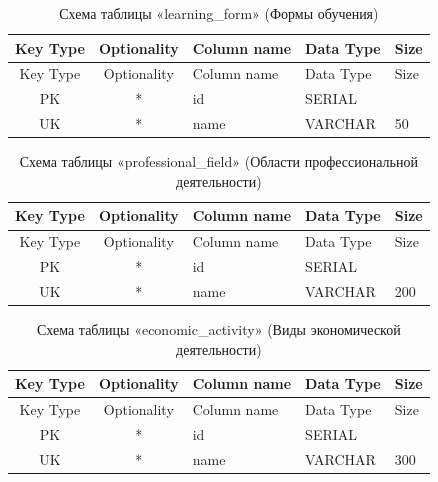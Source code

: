 \begin{xltabular}{\textwidth}{|c|c|l|l|X|}
	\caption{Схема таблицы «learning\_form» (Формы обучения)\label{tab:learning_form}}\\ \hline
	\centrow Key Type & \centrow Optionality & \centrow Column name & \centrow Data Type & \centrow Size \\ \hline
	\endfirsthead
	\centrow Key Type & \centrow Optionality & \centrow Column name & \centrow Data Type & \centrow Size \\ \hline
	\finishhead
	PK & * & id & SERIAL & \\ \hline
	UK & * & name & VARCHAR & 50 \\ \hline
\end{xltabular}

\begin{xltabular}{\textwidth}{|c|c|l|l|X|}
	\caption{Схема таблицы «professional\_field» (Области профессиональной деятельности)\label{tab:professional_field}}\\ \hline
	\centrow Key Type & \centrow Optionality & \centrow Column name & \centrow Data Type & \centrow Size \\ \hline
	\endfirsthead
	\centrow Key Type & \centrow Optionality & \centrow Column name & \centrow Data Type & \centrow Size \\ \hline
	\finishhead
	PK & * & id & SERIAL & \\ \hline
	UK & * & name & VARCHAR & 200 \\ \hline
\end{xltabular}

\begin{xltabular}{\textwidth}{|c|c|l|l|X|}
	\caption{Схема таблицы «economic\_activity» (Виды экономической деятельности)\label{tab:economic_activity}}\\ \hline
	\centrow Key Type & \centrow Optionality & \centrow Column name & \centrow Data Type & \centrow Size \\ \hline
	\endfirsthead
	\centrow Key Type & \centrow Optionality & \centrow Column name & \centrow Data Type & \centrow Size \\ \hline
	\finishhead
	PK & * & id & SERIAL & \\ \hline
	UK & * & name & VARCHAR & 300 \\ \hline
\end{xltabular}

